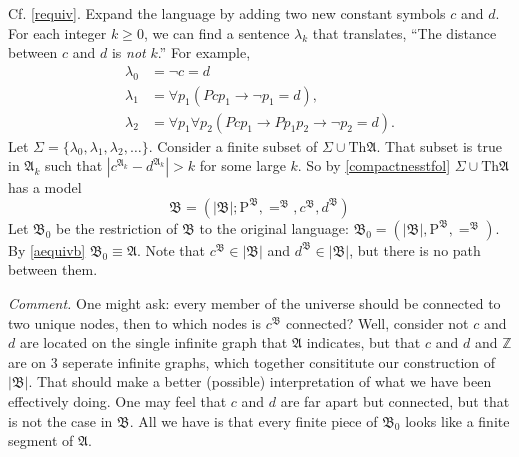 Cf. \ref{requiv}. Expand the language by adding two new constant symbols $c$ and $d$. For each integer $k\geq 0$, we can find a sentence $\lambda_k$ that translates, ``The distance between $c$ and $d$ is \textit{not} $k$.'' For example,
\begin{align*}
  \lambda_0 & =\neg c=d                                                \\
  \lambda_1 & =\forall p_1(Pcp_1\to\neg p_1=d),                        \\
  \lambda_2 & =\forall p_1\forall p_2(Pcp_1\to Pp_1p_2\to \neg p_2=d).
\end{align*}
Let $\Sigma=\{\lambda_0,\lambda_1,\lambda_2,\dots\}.$ Consider a finite subset of $\Sigma\cup \mathrm{Th}\mathfrak{A}$. That subset is true in $\mathfrak{A}_k$ such that $|c^{\mathfrak{A}_k}-d^{\mathfrak{A}_k}|>k$ for some large $k$. So by \ref{compactnesstfol} $\Sigma\cup \mathrm{Th}\mathfrak{A}$ has a model
\[
  \mathfrak{B}=(|\mathfrak{B}|;\mathrm{P}^{\mathfrak{B}},=^{\mathfrak{B}},c^{\mathfrak{B}},d^{\mathfrak{B}})
\]
Let $\mathfrak{B}_0$ be the restriction of $\mathfrak{B}$ to the original language: $\mathfrak{B}_0=(|\mathfrak{B}|,\mathrm{P}^{\mathfrak{B}},=^{\mathfrak{B}})$. By \ref{aequivb} $\mathfrak{B}_0\equiv \mathfrak{A}$. Note that $c^{\mathfrak{B}}\in|\mathfrak{B}|$ and $d^{\mathfrak{B}}\in|\mathfrak{B}|$, but there is no path between them.

\textit{Comment.} One might ask: every member of the universe should be connected to two unique nodes, then to which nodes is $c^{\mathfrak{B}}$ connected? Well, consider not $c$ and $d$ are located on the single infinite graph that $\mathfrak{A}$ indicates, but that $c$ and $d$ and $\mathbb{Z}$ are on 3 seperate infinite graphs, which together consititute our construction of $|\mathfrak{B}|$. That should make a better (possible) interpretation of what we have been effectively doing. One may feel that $c$ and $d$ are far apart but connected, but that is not the case in $\mathfrak{B}$. All we have is that every finite piece of $\mathfrak{B}_0$ looks like a finite segment of $\mathfrak{A}$.
